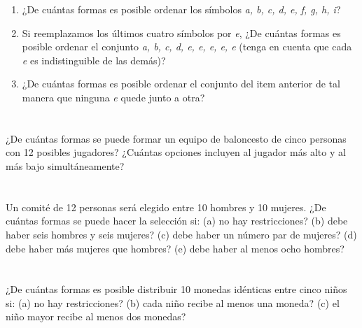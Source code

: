 \documentclass[a4paper,11pt]{article}
\begin{document}
\begin{enumerate}[label=(\alph*),
                  leftmargin=2\parindent,
                  rightmargin=2\parindent]

    \item{
        ¿De cuántas formas es posible ordenar los símbolos
        \emph{a, b, c, d, e, f, g, h, i}?
    }

    \item{
        Si reemplazamos los últimos cuatro símbolos por \emph{e},
        ¿De cuántas formas es posible ordenar el conjunto
        \emph{a, b, c, d, e, e, e, e, e} (tenga en cuenta que cada \emph{e} es
        indistinguible de las demás)?
    }

    \item{
        ¿De cuántas formas es posible ordenar el conjunto del item anterior de tal
        manera que ninguna \emph{e} quede junto a otra?
    }

\end{enumerate}


\section{}

¿De cuántas formas se puede formar un equipo de baloncesto de cinco personas con 12
posibles jugadores? ¿Cuántas opciones incluyen al jugador más alto y al más bajo
simultáneamente?


\section{}

Un comité de 12 personas será elegido entre 10 hombres y 10 mujeres. ¿De cuántas formas
se puede hacer la selección si:
(a) no hay restricciones?
(b) debe haber seis hombres y seis mujeres?
(c) debe haber un número par de mujeres?
(d) debe haber más mujeres que hombres?
(e) debe haber al menos ocho hombres?


\section{}

¿De cuántas formas es posible distribuir 10 monedas idénticas entre cinco niños si:
(a) no hay restricciones?
(b) cada niño recibe al menos una moneda?
(c) el niño mayor recibe al menos dos monedas?

\section{}
\end{document}
